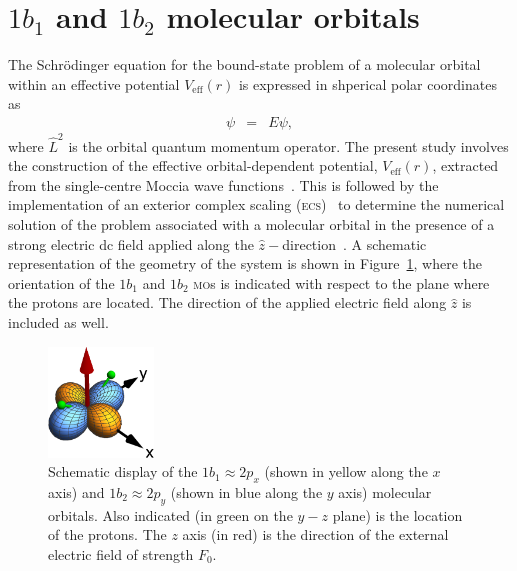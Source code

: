 
\section{$1b_{1}$ and $1b_{2}$ molecular orbitals}
\label{ch:1b1_1b2}

The Schr\"{o}dinger equation for the bound-state problem of a
molecular orbital within an effective potential $V_{\mathrm{eff}}(r)$
is expressed in shperical polar coordinates as
%
\begin{eqnarray}
  [ -\frac{1}{2} \frac{d^2}{dr^2} + \frac{\hat{L}^2}{2r^2} + V_{\rm{eff}}(r)] \psi
  & = & E\psi,
\label{eq:sch_noCS}
\end{eqnarray}
%
where $\hat{L}^{2}$ is the orbital quantum momentum operator. The
present study involves the construction of the effective
orbital-dependent potential, $V_{\mathrm{eff}}(r)$, extracted from the
single-centre Moccia wave functions~\cite{Moccia_1964}. This is
followed by the implementation of an exterior complex scaling
(\textsc{ecs})~\cite{Simon_1979} to determine the numerical solution
of the problem associated with a molecular orbital in the presence of
a strong electric dc field applied along the
$\hat{z}-$direction~\cite{sarias_2016}. A schematic representation of
the geometry of the system is shown in Figure~\ref{fig:h2o_1b1_1b2},
where the orientation of the $1b_{1}$ and $1b_{2}$ \textsc{mo}s is
indicated with respect to the plane where the protons are located. The
direction of the applied electric field along $\hat{z}$ is included as
well.

\begin{figure}
  \centering
  \includegraphics[width=0.25\textwidth]{figures/ch_H2O/1b1_1b2/orbitals.eps}
  \caption{Schematic display of the $1b_{1}\approx 2p_{x}$ (shown in
    yellow along the $x$ axis) and $1b_{2}\approx 2p_{y}$ (shown in
    blue along the $y$ axis) molecular orbitals. Also indicated (in
    green on the $y-z$ plane) is the location of the protons. The $z$
    axis (in red) is the direction of the external electric field of
    strength $F_{0}$.}
  \label{fig:h2o_1b1_1b2}
\end{figure}


